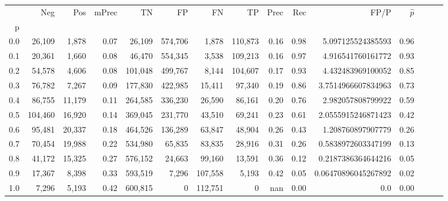 \begin{tabular}{rrrrrrrrrrrrrrr}
\toprule
{} &      Neg &     Pos & mPrec &       TN &       FP &       FN &       TP &  Prec &   Rec &                 FP/P & $\hat{p}$ \\
p   &          &         &       &          &          &          &          &       &       &                      &           \\
\midrule
0.0 &   26,109 &   1,878 &  0.07 &   26,109 &  574,706 &    1,878 &  110,873 &  0.16 &  0.98 &    5.097125524385593 &      0.96 \\
0.1 &   20,361 &   1,660 &  0.08 &   46,470 &  554,345 &    3,538 &  109,213 &  0.16 &  0.97 &    4.916541760161772 &      0.93 \\
0.2 &   54,578 &   4,606 &  0.08 &  101,048 &  499,767 &    8,144 &  104,607 &  0.17 &  0.93 &    4.432483969100052 &      0.85 \\
0.3 &   76,782 &   7,267 &  0.09 &  177,830 &  422,985 &   15,411 &   97,340 &  0.19 &  0.86 &   3.7514966607834963 &      0.73 \\
0.4 &   86,755 &  11,179 &  0.11 &  264,585 &  336,230 &   26,590 &   86,161 &  0.20 &  0.76 &    2.982057808799922 &      0.59 \\
0.5 &  104,460 &  16,920 &  0.14 &  369,045 &  231,770 &   43,510 &   69,241 &  0.23 &  0.61 &   2.0555915246871423 &      0.42 \\
0.6 &   95,481 &  20,337 &  0.18 &  464,526 &  136,289 &   63,847 &   48,904 &  0.26 &  0.43 &    1.208760897907779 &      0.26 \\
0.7 &   70,454 &  19,988 &  0.22 &  534,980 &   65,835 &   83,835 &   28,916 &  0.31 &  0.26 &   0.5838972603347199 &      0.13 \\
0.8 &   41,172 &  15,325 &  0.27 &  576,152 &   24,663 &   99,160 &   13,591 &  0.36 &  0.12 &   0.2187386364644216 &      0.05 \\
0.9 &   17,367 &   8,398 &  0.33 &  593,519 &    7,296 &  107,558 &    5,193 &  0.42 &  0.05 &  0.06470896045267892 &      0.02 \\
1.0 &    7,296 &   5,193 &  0.42 &  600,815 &        0 &  112,751 &        0 &   nan &  0.00 &                  0.0 &      0.00 \\
\bottomrule
\end{tabular}
